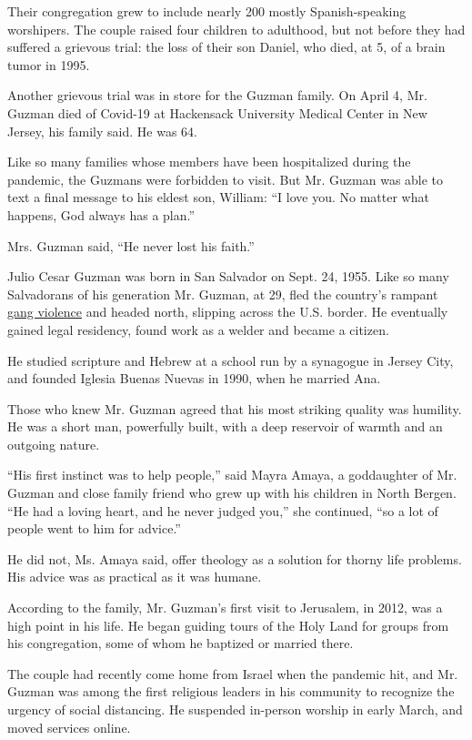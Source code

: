 Their congregation grew to include nearly 200 mostly Spanish-speaking
worshipers. The couple raised four children to adulthood, but not before
they had suffered a grievous trial: the loss of their son Daniel, who
died, at 5, of a brain tumor in 1995.

Another grievous trial was in store for the Guzman family. On April 4,
Mr. Guzman died of Covid-19 at Hackensack University Medical Center in
New Jersey, his family said. He was 64.

Like so many families whose members have been hospitalized during the
pandemic, the Guzmans were forbidden to visit. But Mr. Guzman was able
to text a final message to his eldest son, William: ``I love you. No
matter what happens, God always has a plan.''

Mrs. Guzman said, ``He never lost his faith.''

Julio Cesar Guzman was born in San Salvador on Sept. 24, 1955. Like so
many Salvadorans of his generation Mr. Guzman, at 29, fled the country's
rampant
\href{https://www.nytimes3xbfgragh.onion/2018/12/10/us/el-salvador-ms-13.html}{gang
violence} and headed north, slipping across the U.S. border. He
eventually gained legal residency, found work as a welder and became a
citizen.

He studied scripture and Hebrew at a school run by a synagogue in Jersey
City, and founded Iglesia Buenas Nuevas in 1990, when he married Ana.

Those who knew Mr. Guzman agreed that his most striking quality was
humility. He was a short man, powerfully built, with a deep reservoir of
warmth and an outgoing nature.

``His first instinct was to help people,'' said Mayra Amaya, a
goddaughter of Mr. Guzman and close family friend who grew up with his
children in North Bergen. ``He had a loving heart, and he never judged
you,'' she continued, ``so a lot of people went to him for advice.''

He did not, Ms. Amaya said, offer theology as a solution for thorny life
problems. His advice was as practical as it was humane.

According to the family, Mr. Guzman's first visit to Jerusalem, in 2012,
was a high point in his life. He began guiding tours of the Holy Land
for groups from his congregation, some of whom he baptized or married
there.

The couple had recently come home from Israel when the pandemic hit, and
Mr. Guzman was among the first religious leaders in his community to
recognize the urgency of social distancing. He suspended in-person
worship in early March, and moved services online.

